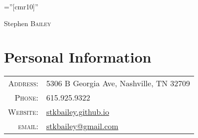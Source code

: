 \documentclass[a4paper,10pt]{article}
\begin{document}

\pagestyle{empty} %

\font\fb=''[cmr10]'' %

\par{\centering
		{\Huge Stephen \textsc{Bailey}
	}\bigskip\par}

\section{Personal Information}

\begin{tabular}{rl}
\textsc{Address:}   & 5306 B Georgia Ave, Nashville, TN 32709 \\
    \textsc{Phone:}     & 615.925.9322 \\
    \textsc{Website:}     & \href{mailto:stkbailey.github.io}{stkbailey.github.io} \\
    \textsc{email:}     & \href{mailto:stkbailey@gmail.com}{stkbailey@gmail.com}
\end{tabular}

\end{document}
